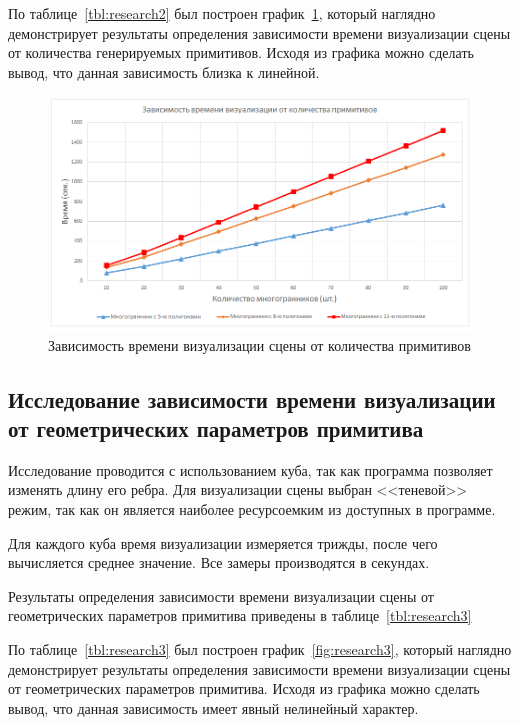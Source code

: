 По таблице~\ref{tbl:research2} был построен график~\ref{fig:research2}, который наглядно демонстрирует результаты определения зависимости времени визуализации сцены от количества генерируемых примитивов. Исходя из графика можно сделать вывод, что данная зависимость близка к линейной.

\clearpage

\begin{figure}[h] 
	\centering
	\includegraphics[width=1\textwidth]{images/research2.png}
	\caption{Зависимость времени визуализации сцены от количества примитивов} 
	\label{fig:research2} 
\end{figure}

\subsection{Исследование зависимости времени визуализации от геометрических параметров примитива}

Исследование проводится с использованием куба, так как программа позволяет изменять длину его ребра. Для визуализации сцены выбран <<теневой>> режим, так как он является наиболее ресурсоемким из доступных в программе.

Для каждого куба время визуализации измеряется трижды, после чего вычисляется среднее значение. Все замеры производятся в секундах.

Результаты определения зависимости времени визуализации сцены от геометрических параметров примитива приведены в таблице~\ref{tbl:research3}

По таблице~\ref{tbl:research3} был построен график~\ref{fig:research3}, который наглядно демонстрирует результаты определения зависимости времени визуализации сцены от геометрических параметров примитива. Исходя из графика можно сделать вывод, что данная зависимость имеет явный нелинейный характер.

